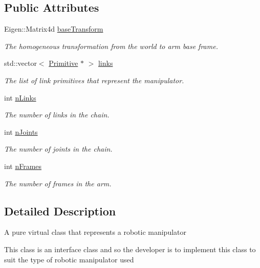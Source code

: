 \subsection*{Public Attributes}
\begin{DoxyCompactItemize}
\item 
Eigen\+::\+Matrix4d \hyperlink{class_arm_ab568839905191e1e5abb83119a4a445d}{base\+Transform}
\begin{DoxyCompactList}\small\item\em The homogeneous transformation from the world to arm base frame. \end{DoxyCompactList}\item 
std\+::vector$<$ \hyperlink{class_primitive}{Primitive} $\ast$ $>$ \hyperlink{class_arm_a427fb95641bb8d0886b2849f0bda36be}{links}
\begin{DoxyCompactList}\small\item\em The list of link primitives that represent the manipulator. \end{DoxyCompactList}\item 
int \hyperlink{class_arm_a911ba9a8c719c090a305f88ab0ae7490}{n\+Links}
\begin{DoxyCompactList}\small\item\em The number of links in the chain. \end{DoxyCompactList}\item 
int \hyperlink{class_arm_ac3734a2ca38b0312fd42894ab6886bc9}{n\+Joints}
\begin{DoxyCompactList}\small\item\em The number of joints in the chain. \end{DoxyCompactList}\item 
int \hyperlink{class_arm_ac7955a5e8e9c6681b55d0d80d7e31df7}{n\+Frames}
\begin{DoxyCompactList}\small\item\em The number of frames in the arm. \end{DoxyCompactList}\end{DoxyCompactItemize}


\subsection{Detailed Description}
A pure virtual class that represents a robotic manipulator

This class is an interface class and so the developer is to implement this class to suit the type of robotic manipulator used 

